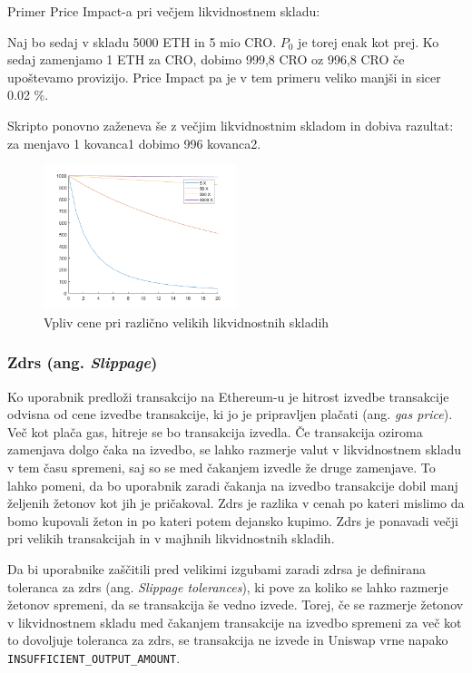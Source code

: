 \documentclass[a4paper,12pt]{article}%
\begin{document}
Primer Price Impact-a pri večjem likvidnostnem skladu:

Naj bo sedaj v skladu 5000 ETH in 5 mio CRO. $P_0$ je torej enak kot prej. Ko sedaj zamenjamo 1 ETH za CRO, dobimo 999,8 CRO oz 996,8 CRO če upoštevamo provizijo. Price Impact pa je v tem primeru veliko manjši in sicer 0.02 \%. 

Skripto ponovno zaženeva še z večjim likvidnostnim skladom in dobiva razultat: za menjavo 1 kovanca1 dobimo 996 kovanca2.

\begin{figure}[!ht]
    \centering
    \includegraphics[width=0.5\textwidth]{impact.png}
        \caption{Vpliv cene pri različno velikih likvidnostnih skladih}  
\end{figure}


\subsubsection{Zdrs (ang. \textit{Slippage})}

Ko uporabnik predloži transakcijo na Ethereum-u je hitrost izvedbe transakcije odvisna od cene izvedbe transakcije, ki jo je pripravljen plačati (ang. \textit{gas price}). Več kot plača gas, hitreje se bo transakcija izvedla. Če transakcija oziroma zamenjava dolgo čaka na izvedbo, se lahko razmerje valut v likvidnostnem skladu v tem času spremeni, saj so se med čakanjem izvedle že druge zamenjave. To lahko pomeni, da bo uporabnik zaradi čakanja na izvedbo transakcije dobil manj željenih žetonov kot jih je pričakoval. Zdrs je razlika v cenah po kateri mislimo da bomo kupovali žeton in po kateri potem dejansko kupimo. Zdrs je ponavadi večji pri velikih transakcijah in v majhnih likvidnostnih skladih.

Da bi uporabnike zaščitili pred velikimi izgubami zaradi zdrsa je definirana toleranca za zdrs (ang. \textit{Slippage tolerances}), ki pove za koliko se lahko razmerje žetonov spremeni, da se transakcija še vedno izvede. Torej, če se razmerje žetonov v likvidnostnem skladu med čakanjem transakcije na izvedbo spremeni za več kot to dovoljuje toleranca za zdrs, se transakcija ne izvede in Uniswap vrne napako \texttt{INSUFFICIENT\_OUTPUT\_AMOUNT}. 
\end{document}

